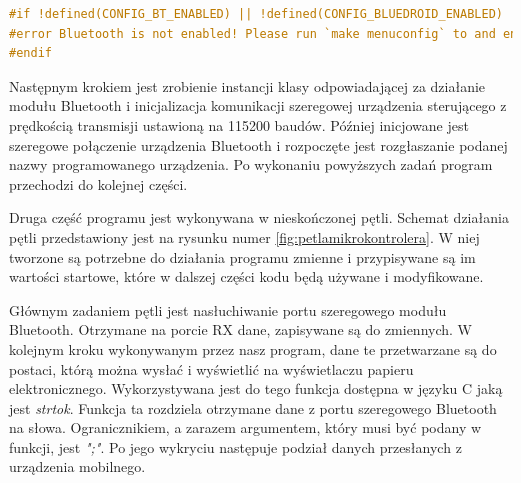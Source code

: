 \documentclass[a4paper,12pt, twoside]{article}
\begin{document}
    \begin{lstlisting}[language=C++, caption=Sprawdzenie poprawności działania Bluetooth]
#if !defined(CONFIG_BT_ENABLED) || !defined(CONFIG_BLUEDROID_ENABLED)
#error Bluetooth is not enabled! Please run `make menuconfig` to and enable it
#endif\end{lstlisting}
    
    	Następnym krokiem jest zrobienie instancji klasy odpowiadającej za działanie modułu Bluetooth i inicjalizacja komunikacji szeregowej urządzenia sterującego z prędkością transmisji ustawioną na 115200 baudów\cite{baud}. Później inicjowane jest szeregowe połączenie urządzenia Bluetooth i rozpoczęte jest rozgłaszanie podanej nazwy programowanego urządzenia. Po wykonaniu powyższych zadań program przechodzi do kolejnej części.
    	
    	Druga część programu jest wykonywana w nieskończonej pętli. Schemat działania pętli przedstawiony jest na rysunku numer \ref{fig:petlamikrokontrolera}. W niej tworzone są potrzebne do działania programu zmienne i przypisywane są im wartości startowe, które w dalszej części kodu będą używane i modyfikowane. 
    	
    	Głównym zadaniem pętli jest nasłuchiwanie portu szeregowego modułu Bluetooth. Otrzymane na porcie RX dane, zapisywane są do zmiennych. W kolejnym kroku wykonywanym przez nasz program, dane te przetwarzane są do postaci, którą można wysłać i wyświetlić na wyświetlaczu papieru elektronicznego. Wykorzystywana jest do tego funkcja dostępna w języku C jaką jest \textit{strtok}\cite{strtok}. Funkcja ta rozdziela otrzymane dane z portu szeregowego Bluetooth na słowa. \label{petladekod}Ogranicznikiem, a zarazem argumentem, który musi być podany w funkcji, jest \textit{";"}. Po jego wykryciu następuje podział danych przesłanych z urządzenia mobilnego.
    	
\end{document}
